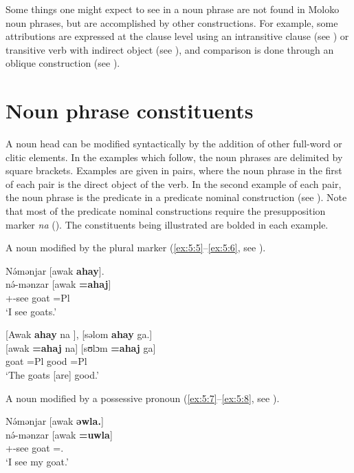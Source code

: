 Some things one might expect to see in a noun phrase are not found in Moloko noun phrases, but are accomplished by other constructions. For example, some attributions are expressed at the clause level using an intransitive clause (see ) or transitive verb with indirect object (see ), and comparison is done through an oblique construction (see ). 

\section{Noun phrase constituents}\label{sec:5.1}
\hypertarget{RefHeading1211581525720847}{}
A noun head can be modified syntactically by the addition of other full-word or clitic elements. In the examples which follow, the noun phrases are delimited by square brackets. Examples are given in pairs, where the noun phrase in the first of each pair is the direct object of the verb. In the second example of each pair, the noun phrase is the predicate in a predicate nominal construction (see ). Note that most of the predicate nominal constructions require the presupposition marker \textit{na } (). The constituents being illustrated are bolded in each example. 

A noun modified by the plural marker (\ref{ex:5:5}--\ref{ex:5:6}, see ).

\ea \label{ex:5:5}
N\'{ə}mənjar  [awak \textbf{ahay}].\\
\gll  n\'{ə}-mənzar  [awak  \textbf{=ahaj}]\\
      {\oneS}+{\IFV}-see  goat  =Pl\\
\glt  ‘I see goats.’
\z

\ea \label{ex:5:6}
{}[Awak\textbf{  ahay}  na ],  [səlom  \textbf{ahay}  ga.]\\
\gll  {}[awak   \textbf{=ahaj}     na]   [sʊlɔm   \textbf{=ahaj}   ga]\\
      goat    =Pl  {\PSP}  good  =Pl  {\ADJ}\\
\glt  ‘The goats [are] good.’
\z

A noun modified by a possessive pronoun (\ref{ex:5:7}--\ref{ex:5:8}, see ).

\ea \label{ex:5:7}
N\'{ə}mənjar  [awak \textbf{əwla.}]   \\
\gll  n\'{ə}-mənzar [awak \textbf{=uwla}]\\
      {\oneS}+{\IFV}-see  goat  ={\oneS}.{\POSS}\\
\glt  ‘I see my goat.’
\z


